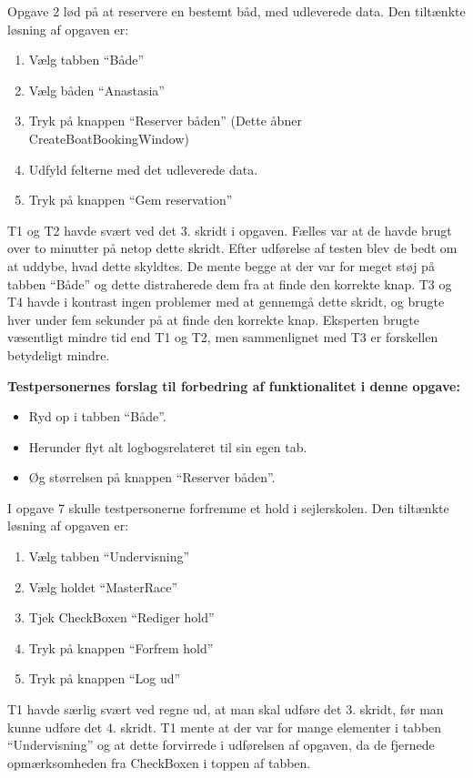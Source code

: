 Opgave 2 lød på at reservere en bestemt båd, med udleverede data.
Den tiltænkte løsning af opgaven er:
\begin{enumerate}
    \item Vælg tabben ``Både''
    \item Vælg båden ``Anastasia''
    \item Tryk på knappen ``Reserver båden'' (Dette åbner CreateBoatBookingWindow)
    \item Udfyld felterne med det udleverede data.
    \item Tryk på knappen ``Gem reservation''
\end{enumerate}

T1 og T2 havde svært ved det 3. skridt i opgaven.
Fælles var at de havde brugt over to minutter på netop dette skridt.
Efter udførelse af testen blev de bedt om at uddybe, hvad dette skyldtes.
De mente begge at der var for meget støj på tabben ``Både'' og dette distraherede dem fra at finde den korrekte knap.
T3 og T4 havde i kontrast ingen problemer med at gennemgå dette skridt, og brugte hver under fem sekunder på at finde den korrekte knap. 
Eksperten brugte væsentligt mindre tid end T1 og T2, men sammenlignet med T3 er forskellen betydeligt mindre.

\textbf{Testpersonernes forslag til forbedring af funktionalitet i denne opgave:}
\begin{itemize}
    \item Ryd op i tabben ``Både''. 
    \item Herunder flyt alt logbogsrelateret til sin egen tab.
    \item Øg størrelsen på knappen ``Reserver båden''.
\end{itemize}

I opgave 7 skulle testpersonerne forfremme et hold i sejlerskolen. 
Den tiltænkte løsning af opgaven er:
\begin{enumerate}
    \item Vælg tabben ``Undervisning''
    \item Vælg holdet ``MasterRace''
    \item Tjek CheckBoxen ``Rediger hold''
    \item Tryk på knappen ``Forfrem hold''
    \item Tryk på knappen ``Log ud''
\end{enumerate}

T1 havde særlig svært ved regne ud, at man skal udføre det 3. skridt, før man kunne udføre det 4. skridt.
T1 mente at der var for mange elementer i tabben ``Undervisning'' og at dette forvirrede i udførelsen af opgaven, da de fjernede opmærksomheden fra CheckBoxen i toppen af tabben.


